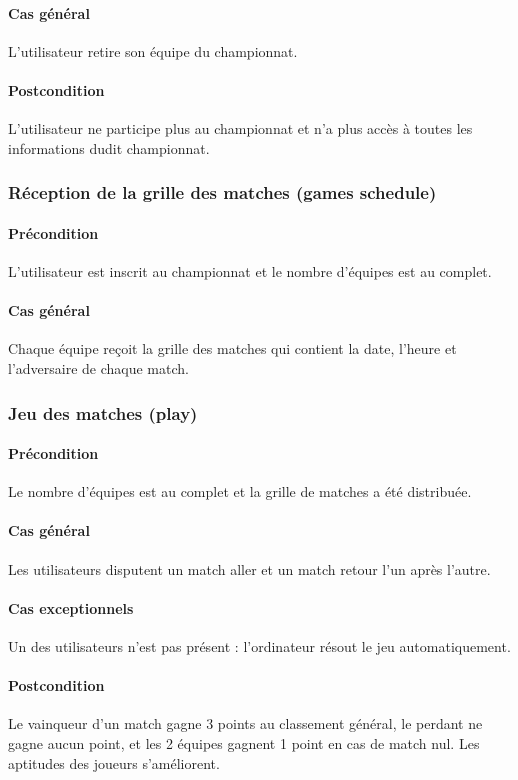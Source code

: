 	\paragraph{Cas général} L'utilisateur retire son équipe du championnat.
	\paragraph{Postcondition} L'utilisateur ne participe plus au championnat et n'a plus accès à toutes les informations dudit championnat.

\subsubsection{Réception de la grille des matches (games schedule)}
	\paragraph{Précondition} L'utilisateur est inscrit au championnat et le nombre 
	      d'équipes est au complet.
	\paragraph{Cas général} Chaque équipe reçoit la grille des matches qui contient la date, l'heure et l'adversaire de chaque match.

\subsubsection{Jeu des matches (play)}
	\paragraph{Précondition} Le nombre d'équipes est au complet et la grille de matches a été distribuée.
	\paragraph{Cas général} Les utilisateurs disputent un match aller et un match retour l'un  après l'autre.
	\paragraph{Cas exceptionnels} Un des utilisateurs n'est pas présent : l'ordinateur résout le jeu automatiquement.
	\paragraph{Postcondition} Le vainqueur d'un match gagne 3 points au classement général, le perdant ne gagne aucun point, et les 2 équipes gagnent 1 point en cas de match nul. Les aptitudes des joueurs s'améliorent.

